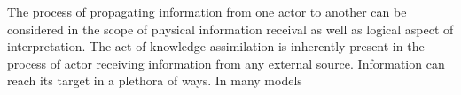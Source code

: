 The process of propagating information from one actor to another can be considered in the scope of physical information receival as well as logical aspect of interpretation.
The act of knowledge assimilation is inherently present in the process of actor receiving information from any external source.
Information can reach its target in a plethora of ways.
In many models

